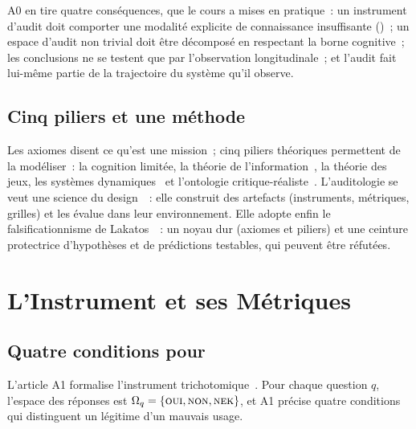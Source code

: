 A0 en tire quatre conséquences, que le cours a mises en pratique~: un
instrument d'audit doit comporter une modalité explicite de connaissance
insuffisante (\NEK{})~; un espace d'audit non trivial doit être décomposé
en respectant la borne cognitive~; les conclusions ne se testent que par
l'observation longitudinale~; et l'audit fait lui-même partie de la
trajectoire du système qu'il observe.

\subsection{Cinq piliers et une méthode}

Les axiomes disent ce qu'est une mission~; cinq piliers théoriques
permettent de la modéliser~: la cognition limitée, la théorie de
l'information~\cite{shannon1948,kullback1951}, la théorie des jeux, les
systèmes dynamiques~\cite{norris1998} et l'ontologie
critique-réaliste~\cite{bhaskar1975}. L'auditologie se veut une science du
design~\cite{hevner2004design}~: elle construit des artefacts (instruments,
métriques, grilles) et les évalue dans leur environnement. Elle adopte enfin
le falsificationnisme de Lakatos~\cite{lakatos1970}~: un noyau dur
(axiomes et piliers) et une ceinture protectrice d'hypothèses et de
prédictions testables, qui peuvent être réfutées.

\section{L'Instrument et ses Métriques}
\label{sec:c16-instrument}

\subsection{Quatre conditions pour \NEK{}}

L'article A1 formalise l'instrument trichotomique~\cite{minka2026nek}. Pour
chaque question $q$, l'espace des réponses est
$\Omega_q = \{\textsc{oui}{}, \textsc{non}{}, \textsc{nek}{}\}$, et A1 précise quatre conditions
qui distinguent un \NEK{} légitime d'un mauvais usage.

